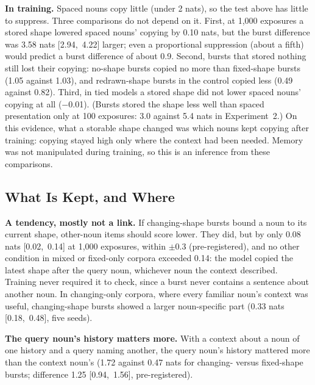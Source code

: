 \documentclass{article}
\begin{document}
\textbf{In training.} Spaced nouns copy little (under 2 nats), so the test above has little to suppress. Three comparisons do not depend on it. First, at 1,000 exposures a stored shape lowered spaced nouns' copying by 0.10 nats, but the burst difference was 3.58 nats [2.94,~4.22] larger; even a proportional suppression (about a fifth) would predict a burst difference of about 0.9. Second, bursts that stored nothing still lost their copying: no-shape bursts copied no more than fixed-shape bursts (1.05 against 1.03), and redrawn-shape bursts in the control copied less (0.49 against 0.82). Third, in tied models a stored shape did not lower spaced nouns' copying at all ($-$0.01). (Bursts stored the shape less well than spaced presentation only at 100 exposures: 3.0 against 5.4 nats in Experiment~2.) On this evidence, what a storable shape changed was which nouns kept copying after training: copying stayed high only where the context had been needed. Memory was not manipulated during training, so this is an inference from these comparisons.

\subsection{What Is Kept, and Where}\label{sec:kept}
\textbf{A tendency, mostly not a link.} If changing-shape bursts bound a noun to its current shape, other-noun items should score lower. They did, but by only 0.08 nats [0.02,~0.14] at 1,000 exposures, within $\pm$0.3 (pre-registered), and no other condition in mixed or fixed-only corpora exceeded 0.14: the model copied the latest shape after the query noun, whichever noun the context described. Training never required it to check, since a burst never contains a sentence about another noun. In changing-only corpora, where every familiar noun's context was useful, changing-shape bursts showed a larger noun-specific part (0.33 nats [0.18,~0.48], five seeds).

\textbf{The query noun's history matters more.} With a context about a noun of one history and a query naming another, the query noun's history mattered more than the context noun's (1.72 against 0.47 nats for changing- versus fixed-shape bursts; difference 1.25 [0.94,~1.56], pre-registered).
\end{document}
